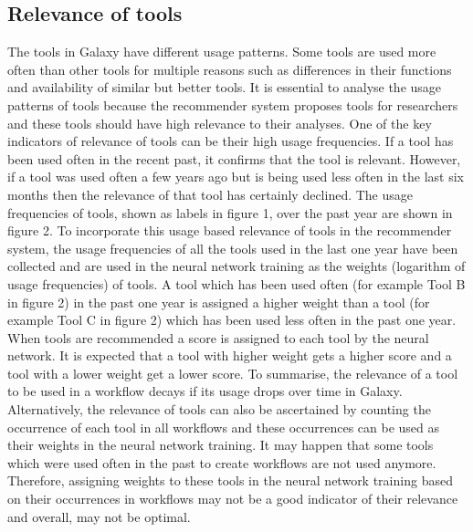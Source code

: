 \documentclass{bioinfo}
\begin{document}
\subsection{Relevance of tools}
The tools in Galaxy have different usage patterns. Some tools are used more often than other tools for multiple reasons such as differences in their functions and availability of similar but better tools. It is essential to analyse the usage patterns of tools because the recommender system proposes tools for researchers and these tools should have high relevance to their analyses. One of the key indicators of relevance of tools can be their high usage frequencies. If a tool has been used often in the recent past, it confirms that the tool is relevant. However, if a tool was used often a few years ago but is being used less often in the last six months then the relevance of that tool has certainly declined. The usage frequencies of tools, shown as labels in figure 1, over the past year are shown in figure 2. To incorporate this usage based relevance of tools in the recommender system, the usage frequencies of all the tools used in the last one year have been collected and are used in the neural network training as the weights (logarithm of usage frequencies) of tools. A tool which has been used often (for example Tool B in figure 2) in the past one year is assigned a higher weight than a tool (for example Tool C in figure 2) which has been used less often in the past one year. When tools are recommended a score is assigned to each tool by the neural network. It is expected that a tool with higher weight gets a higher score and a tool with a lower weight get a lower score. To summarise, the relevance of a tool to be used in a workflow decays if its usage drops over time in Galaxy. Alternatively, the relevance of tools can also be ascertained by counting the occurrence of each tool in all workflows and these occurrences can be used as their weights in the neural network training. It may happen that some tools which were used often in the past to create workflows are not used anymore. Therefore, assigning weights to these tools in the neural network training based on their occurrences in workflows may not be a good indicator of their relevance and overall, may not be optimal.
\end{document}
